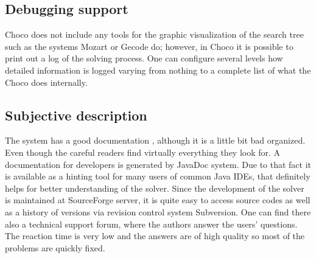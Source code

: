\subsection{Debugging support}
Choco does not include any tools for the graphic visualization of the search tree such as the systems Mozart or Gecode do;
however, in Choco it is possible to print out a log of the solving process.
One can configure several levels how detailed information is logged varying from
nothing to a complete list of what the Choco does internally.

\subsection{Subjective description}
The system has a good documentation \cite{choco:documentation}, although it is a little bit bad organized. Even though the careful readers
find virtually everything they look for. A documentation for developers is generated
by JavaDoc system. Due to that fact it is available as a hinting tool for many users of common Java IDEs, 
that definitely helps for better understanding of the solver. Since the development of the solver is
maintained at SourceForge server, it is quite easy to access source codes as well as a history of versions via
revision control system Subversion. One can find there also a technical support forum, where the authors
answer the users' questions. The reaction time is very low and the answers are of high
quality so most of the problems are quickly fixed.